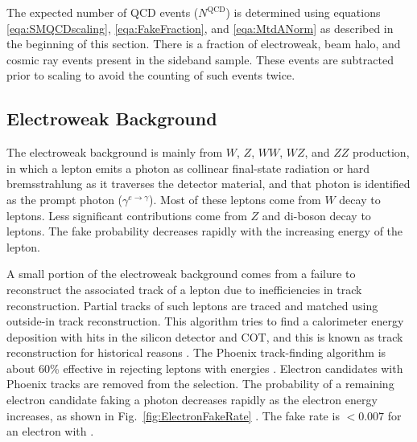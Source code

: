 The expected number of QCD events ($N^\mathrm{QCD}$) is determined using equations \ref{eqa:SMQCDscaling}, \ref{eqa:FakeFraction}, and \ref{eqa:MtdANorm} as described in the beginning of this section. There is a fraction of electroweak, beam halo, and cosmic ray events present in the sideband sample. These events are subtracted prior to scaling to avoid the counting of such events twice.

\subsection{Electroweak Background}\label{sec:elejets}
The electroweak background is mainly from $W$, $Z$, $WW$, $WZ$, and $ZZ$ production, in which a lepton emits a photon as collinear final-state radiation or hard bremsstrahlung as it traverses the detector material, and that photon is identified as the prompt photon ($\gamma^{e\to \gamma}$). Most of these leptons come from $W$ decay to leptons. Less significant contributions come from $Z$ and di-boson decay to leptons. The fake probability decreases rapidly with the increasing energy of the lepton.

A small portion of the electroweak background comes from a failure to reconstruct the associated track of a lepton due to inefficiencies in track reconstruction. Partial tracks of such leptons are traced and matched using outside-in track reconstruction. This algorithm tries to find a calorimeter energy deposition with hits in the silicon detector and COT, and this is known as  track reconstruction for historical reasons \cite{pap:PhoenixTracking}. The Phoenix track-finding algorithm is about 60\% effective in rejecting leptons with energies . Electron candidates with Phoenix tracks are removed from the selection. The probability of a remaining electron candidate faking a photon decreases rapidly as the electron energy increases, as shown in Fig.~\ref{fig:ElectronFakeRate} \cite{cdfnote:8220}. The fake rate is $<0.007$ for an electron with .

